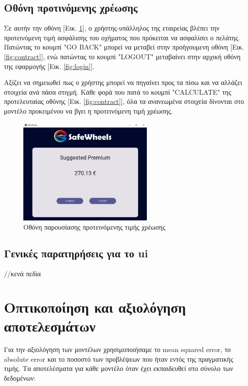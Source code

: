 \documentclass{llncs}
\begin{document}
\newpage
\subsection {Οθόνη προτινόμενης χρέωσης}
Σε αυτήν την οθόνη [Εικ. \ref{fig:premium}], ο χρήστης-υπάλληλος της εταιρείας βλέπει την προτεινόμενη τιμή ασφάλισης του οχήματος που πρόκειται να ασφαλίσει ο πελάτης.
Πατώντας το κουμπί "GO BACK" μπορεί να μεταβεί στην προήγουμενη οθόνη [Εικ. \ref{fig:contract}], ενώ πατώντας το κουμπί "LOGOUT" μεταβαίνει στην αρχική οθόνη της εφαρμογής [Εικ. \ref{fig:login}].

Αξίζει να σημειωθεί πως ο χρήστης μπορεί να πηγαίνει προς τα πίσω και να αλλάζει στοιχεία ανά πάσα στιγμή. Κάθε φορά που πατά το κουμπί "CALCULATE" της προτελευταίας οθόνης [Εικ. \ref{fig:contract}], 
όλα τα ανανεωμένα στοιχεία δίνονται στο μοντέλο προκειμένου να βγει η προτεινόμενη τιμή χρέωσης.

\begin{figure}
    \begin{center}
        \includegraphics[width=0.6\textwidth]{images/suggested_premium.png}
    \end{center}
    \caption{Οθόνη παρουσίασης προτεινόμενης τιμής χρέωσης}  
    \label{fig:premium}  
\end{figure}

\subsection{Γενικές παρατηρήσεις για το ui}
//κενά πεδία


\section{Oπτικοποίηση και αξιολόγηση αποτελεσμάτων}

Για την αξιολόγηση των μοντέλων χρησιμοποιήσαμε το mean squared error, το absolute error και το ποσοστό των προβλέψεων που 
ήταν εντός της πραγματικής τιμής. Τα αποτελέσματα για κάθε μοντέλο όταν έχει εκπαιδευθεί στο σύνολο των δεδομένων:
\end{document}
